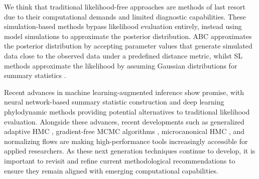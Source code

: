 \documentclass{article}
\begin{document}
We think that traditional likelihood-free approaches are methods of last resort due to their computational demands and limited diagnostic capabilities.
These simulation-based methods bypass likelihood evaluation entirely, instead using model simulations to approximate the posterior distribution.
\ac{ABC} approximates the posterior distribution by accepting parameter values that generate simulated data close to the observed data under a predefined distance metric, whilst \ac{SL} methods approximate the likelihood by assuming Gaussian distributions for summary statistics \citep{beaumont2002approximate, wood2010statistical, price2018bayesian}. 

Recent advances in machine learning-augmented inference show promise, with neural network-based summary statistic construction \citep{raynal2019abc} and deep learning phylodynamic methods \citep{voznica2022deep} providing potential alternatives to traditional likelihood evaluation. Alongside these advances, recent developments such as generalized adaptive \ac{HMC} \citep{bou2025within}, gradient-free \ac{MCMC} algorithms \citep{bou2025no}, microcanonical \ac{HMC} \citep{robnik2023microcanonical}, and normalizing flows \citep{papamakarios2021normalizing} are making high-performance tools increasingly accessible for applied researchers. As these next generation techniques continue to develop, it is important to revisit and refine current methodological recommendations to ensure they remain aligned with emerging computational capabilities.
\end{document}
